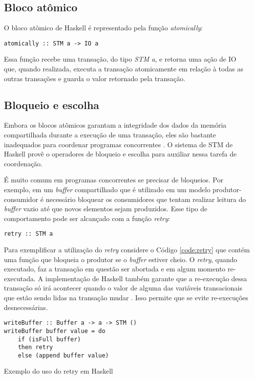 \subsection{Bloco atômico}

O bloco atômico de Haskell é representado pela função \emph{atomically}:
\begin{verbatim}
atomically :: STM a -> IO a
\end{verbatim}

Essa função recebe uma transação, do tipo \emph{STM a}, e retorna uma ação de IO que, quando realizada, executa a transação atomicamente em relação à todas as outras transações  e guarda o valor retornado pela transação.

\subsection{Bloqueio e escolha}

Embora os blocos atômicos garantam a integridade dos dados da memória compartilhada durante a execução de uma transação, eles são bastante inadequados para coordenar programas concorrentes \cite{jones2007beautiful}. O sistema de STM de Haskell provê o operadores de bloqueio e escolha para auxiliar nessa tarefa de coordenação.

É muito comum em programas concorrentes se precisar de bloqueios. Por exemplo, em um \emph{buffer} compartilhado que é utilizado em um modelo produtor-consumidor é necessário bloquear os consumidores que tentam realizar leitura do \emph{buffer} vazio até que novos elementos sejam produzidos. Esse tipo de comportamento pode ser alcançado com a função \emph{retry}:
\begin{verbatim}
retry :: STM a
\end{verbatim}

Para exemplificar a utilização do \emph{retry} considere o Código \ref{code:retry} que contém uma função que bloqueia o produtor se o \emph{buffer} estiver cheio. O \emph{retry}, quando executado, faz a transação em questão ser abortada e em algum momento re-executada. A implementação de Haskell também garante que a re-execução dessa transação só irá acontecer quando o valor de alguma das variáveis transacionais que estão sendo lidas na transação mudar \cite{harris2005composable}. Isso permite que se evite re-execuções desnecessárias.

\begin{listing}
  \begin{verbatim}
writeBuffer :: Buffer a -> a -> STM ()
writeBuffer buffer value = do
    if (isFull buffer)
    then retry
    else (append buffer value)
  \end{verbatim}
  \caption{Exemplo do uso do retry em Haskell}
  \label{code:retry}
\end{listing}


